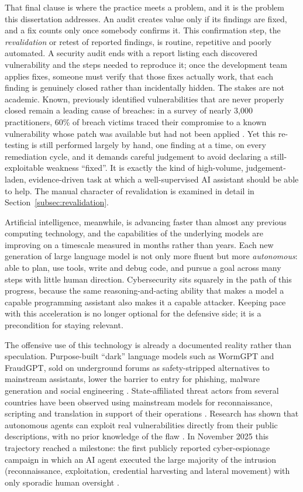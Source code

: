 That final clause is where the practice meets a problem, and it is the problem this
dissertation addresses. An audit creates value only if its findings are fixed, and a
fix counts only once somebody confirms it. This confirmation step, the
\emph{revalidation} or retest of reported findings, is routine, repetitive and
poorly automated. A security audit ends with a report listing each discovered
vulnerability and the steps needed to reproduce it; once the development team applies
fixes, someone must verify that those fixes actually work, that each finding is
genuinely closed rather than incidentally hidden. The stakes are not academic. Known,
previously identified vulnerabilities that are never properly closed remain a leading
cause of breaches: in a survey of nearly 3{,}000 practitioners, 60\% of breach victims
traced their compromise to a known vulnerability whose patch was available but had not
been applied \cite{ponemon_vulnerability_2019}. Yet this re-testing is still performed
largely by hand, one finding at a time, on every remediation cycle, and it demands
careful judgement to avoid declaring a still-exploitable weakness ``fixed''. It is
exactly the kind of high-volume, judgement-laden, evidence-driven task at which a
well-supervised AI assistant should be able to help. The manual character of
revalidation is examined in detail in Section~\ref{subsec:revalidation}.

Artificial intelligence, meanwhile, is advancing faster than almost any previous computing
technology, and the capabilities of the underlying models are improving on a
timescale measured in months rather than years. Each new generation of large
language model is not only more fluent but more \emph{autonomous}: able to plan,
use tools, write and debug code, and pursue a goal across many steps with little
human direction. Cybersecurity sits squarely in the path of this progress,
because the same reasoning-and-acting ability that makes a model a capable
programming assistant also makes it a capable attacker. Keeping pace with this
acceleration is no longer optional for the defensive side; it is a precondition
for staying relevant.

The offensive use of this technology is already a documented reality rather than
speculation. Purpose-built ``dark'' language models such as WormGPT and FraudGPT,
sold on underground forums as safety-stripped alternatives to mainstream
assistants, lower the barrier to entry for phishing, malware generation and social
engineering \cite{malla2024}. State-affiliated threat actors from several countries
have been observed using mainstream models for reconnaissance, scripting and
translation in support of their operations \cite{openai_threatactors}. Research has
shown that autonomous agents can exploit real vulnerabilities directly from their
public descriptions, with no prior knowledge of the flaw \cite{fang2024oneday}. In
November 2025 this trajectory reached a milestone: the first publicly reported
cyber-espionage campaign in which an AI agent executed the large majority of the
intrusion (reconnaissance, exploitation, credential harvesting and lateral
movement) with only sporadic human oversight \cite{anthropic_espionage}.

